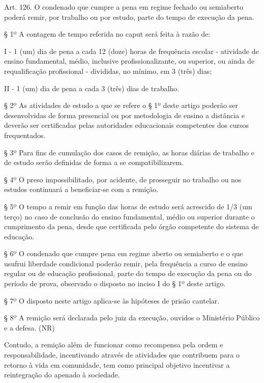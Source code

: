 \begin{citacao}
Art. 126. O condenado que cumpre a pena em regime fechado ou semiaberto poderá remir, por trabalho ou por estudo, parte do tempo de execução da pena.

§ 1º A contagem de tempo referida no caput será feita à razão de:

I - 1 (um) dia de pena a cada 12 (doze) horas de frequência escolar - atividade de ensino fundamental, médio, inclusive profissionalizante, ou superior, ou ainda de requalificação profissional - divididas, no mínimo, em 3 (três) dias;

II - 1 (um) dia de pena a cada 3 (três) dias de trabalho.

§ 2º As atividades de estudo a que se refere o § 1º deste artigo poderão ser desenvolvidas de forma presencial ou por metodologia de ensino a distância e deverão ser certificadas pelas autoridades educacionais competentes dos cursos frequentados.

§ 3º Para fins de cumulação dos casos de remição, as horas diárias de trabalho e de estudo serão definidas de forma a se compatibilizarem.

§ 4º O preso impossibilitado, por acidente, de prosseguir no trabalho ou nos estudos continuará a beneficiar-se com a remição.

§ 5º O tempo a remir em função das horas de estudo será acrescido de 1/3 (um terço) no caso de conclusão do ensino fundamental, médio ou superior durante o cumprimento da pena, desde que certificada pelo órgão competente do sistema de educação.

§ 6º O condenado que cumpre pena em regime aberto ou semiaberto e o que usufrui liberdade condicional poderão remir, pela frequência a curso de ensino regular ou de educação profissional, parte do tempo de execução da pena ou do período de prova, observado o disposto no inciso I do § 1º deste artigo.

§ 7º O disposto neste artigo aplica-se às hipóteses de prisão cautelar.

§ 8º A remição será declarada pelo juiz da execução, ouvidos o Ministério Público e a defesa. (NR)

\end{citacao}

Contudo, a remição além de funcionar como recompensa pela ordem e responsabilidade, incentivando através de atividades que contribuem para o retorno à vida em comunidade, tem como principal objetivo incentivar a reintegração do apenado à sociedade.\cite{lep}


